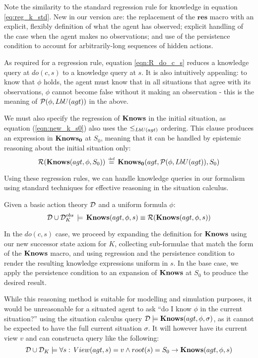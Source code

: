 Note the similarity to the standard regression rule for knowledge
in equation \eqref{eq:reg_k_std}. New in our version are: the replacement
of the $\mathbf{res}$ macro with an explicit, flexibly definition
of what the agent has observed; explicit handling of the case when
the agent makes no observations; and use of the persistence condition
to account for arbitrarily-long sequences of hidden actions.

As required for a regression rule, equation \eqref{eqn:R_do_c_s}
reduces a knowledge query at $do(c,s)$ to a knowledge query at $s$.
It is also intuitively appealing: to know that $\phi$ holds, the
agent must know that in all situations that agree with its observations,
$\phi$ cannot become false without it making an observation - this
is the meaning of $\mathcal{P}(\phi,LbU(agt))$ in the above.

We must also specify the regression of $\mathbf{Knows}$ in the initial situation,
as equation (\ref{eqn:new_k_s0}) also uses the $\leq_{LbU(agt)}$
ordering. This clause produces an expression in $\mathbf{Knows_{0}}$ at $S_{0}$,
meaning that it can be handled by epistemic reasoning about the initial
situation only:\begin{equation}
\mathcal{R}(\mathbf{Knows}(agt,\phi,S_{0}))\,\stackrel{\mbox{\tiny def}}{=}\,\mathbf{Knows_{0}}(agt,\mathcal{P}(\phi,LbU(agt)),S_{0})\label{eqn:R_s0}\end{equation}


Using these regression rules, we can handle knowledge queries in our
formalism using standard techniques for effective reasoning in the
situation calculus.

\begin{thm}
\label{thm:Reg_Knows}Given a basic action theory $\mathcal{D}$ and a uniform
formula $\phi$:\[
\mathcal{D}\cup\mathcal{D}_{K}^{obs}\,\models\,\mathbf{Knows}(agt,\phi,s)\equiv\mathcal{R}(\mathbf{Knows}(agt,\phi,s))\]

\end{thm}
\begin{proofsketch}
In the $do(c,s)$ case, we proceed by expanding the definition for
$\mathbf{Knows}$ using our new successor state axiom for $K$, collecting
sub-formulae that match the form of the $\mathbf{Knows}$ macro, and using
regression and the persistence condition to render the resulting knowledge
expressions uniform in $s$. In the base case, we apply the persistence
condition to an expansion of $\mathbf{Knows}$ at $S_{0}$ to produce the
desired result. 
\end{proofsketch}
While this reasoning method is suitable for modelling and simulation
purposes, it would be unreasonable for a situated agent to ask {}``do
I know $\phi$ in the current situation?'' using the situation calculus
query $\mathcal{D}\models\mathbf{Knows}(agt,\phi,\sigma)$, as it cannot be
expected to have the full current situation $\sigma$. It will however
have its current view $v$ and can constructa query like the following:\[
\mathcal{D}\cup\mathcal{D}_{K}\models\forall s:\, View(agt,s)=v\wedge root(s)=S_{0}\rightarrow\mathbf{Knows}(agt,\phi,s)\]


